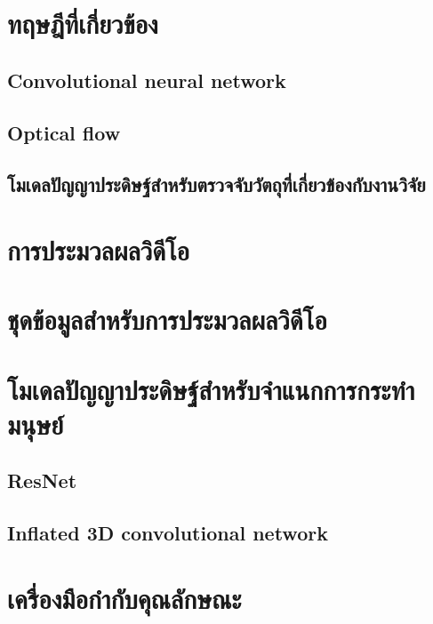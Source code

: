 \section{ทฤษฎีที่เกี่ยวข้อง}
\subsection{Convolutional neural network}

\clearpage

\subsection{Optical flow}

\clearpage

\subsection{โมเดลปัญญาประดิษฐ์สำหรับตรวจจับวัตถุที่เกี่ยวข้องกับงานวิจัย}


\section{การประมวลผลวิดีโอ}

\clearpage

\section{ชุดข้อมูลสำหรับการประมวลผลวิดีโอ}

\clearpage

\section{โมเดลปัญญาประดิษฐ์สำหรับจำแนกการกระทำมนุษย์}
\subsection{ResNet}

\clearpage
\subsection{Inflated 3D convolutional network}

\clearpage

\section{เครื่องมือกำกับคุณลักษณะ}
